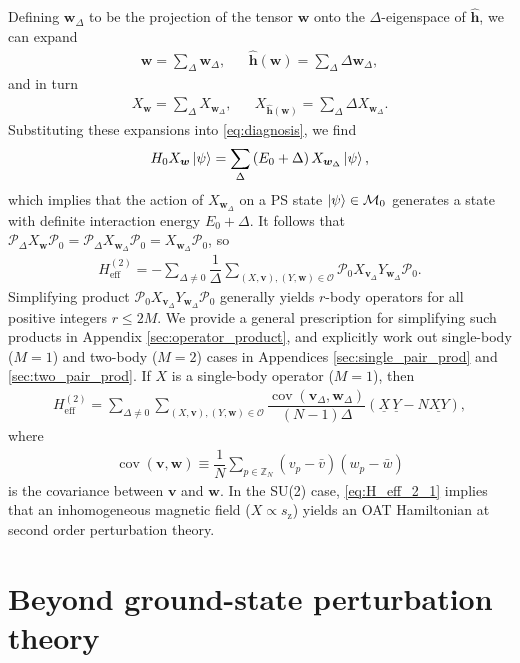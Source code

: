 \documentclass[nofootinbib,notitlepage,11pt]{revtex4-2}
\renewcommand{\t}{\text} %
\newcommand{\f}[2]{\dfrac{#1}{#2}} %
\newcommand{\p}[1]{\left(#1\right)} %
\newcommand{\m}{\bm} %
\newcommand{\1}{\mathds{1}}
\newcommand{\z}{\text{z}}
\newcommand{\M}{\mathcal{M}}
\renewcommand{\O}{\mathcal{O}}
\renewcommand{\P}{\mathcal{P}}
\newcommand{\ZZ}{\mathbb{Z}}
\newcommand{\col}{\underline}
\DeclareMathOperator{\cov}{cov}
\begin{document}
Defining $\m w_\Delta$ to be the projection of the tensor $\m w$ onto
the $\Delta$-eigenspace of $\hat{\m h}$, we can expand
\begin{align}
  \m w = \sum_\Delta \m w_\Delta,
  &&
  \hat{\m h}\p{\m w} = \sum_\Delta \Delta \m w_\Delta,
\end{align}
and in turn
\begin{align}
  X_{\m w} = \sum_\Delta X_{\m w_\Delta},
  &&
  X_{\hat{\m h}\p{\m w}} = \sum_\Delta \Delta X_{\m w_\Delta}.
\end{align}
Substituting these expansions into \eqref{eq:diagnosis}, we find
\begin{align}
  H_0 X_{\m w} \ket\psi
  = \sum_\Delta\p{E_0 + \Delta} X_{\m w_\Delta} \ket\psi,
\end{align}
which implies that the action of $X_{\m w_\Delta}$ on a PS state
$\ket\psi\in\M_0$ generates a state with definite interaction energy
$E_0+\Delta$.  It follows that
$\P_\Delta X_{\m w} \P_0 = \P_\Delta X_{\m w_\Delta} \P_0 =
X_{\m{w}_\Delta} \P_0$, so
\begin{align}
  H_{\t{eff}}^{(2)} = -\sum_{\Delta\ne0} \f1\Delta
  \sum_{\p{X,\m v},\p{Y,\m w}\in\O}
  \P_0 X_{\m v_\Delta} Y_{\m w_\Delta} \P_0.
\end{align}
Simplifying product $\P_0 X_{\m v_\Delta} Y_{\m w_\Delta} \P_0$
generally yields $r$-body operators for all positive integers
$r\le2M$.  We provide a general prescription for simplifying such
products in Appendix \ref{sec:operator_product}, and explicitly work
out single-body ($M=1$) and two-body ($M=2$) cases in Appendices
\ref{sec:single_pair_prod} and \ref{sec:two_pair_prod}.  If $X$ is a
single-body operator ($M=1$), then
\begin{align}
  H_{\t{eff}}^{(2)}
  = \sum_{\Delta\ne0} \sum_{\p{X,\m v},\p{Y,\m w}\in\O}
  \f{\cov\p{\m v_\Delta,\m w_\Delta}}{\p{N-1}\Delta}
  \p{\col{X}\,\col{Y} - N \col{XY}},
  \label{eq:H_eff_2_1}
\end{align}
where
\begin{align}
  \cov\p{\m v,\m w} \equiv
  \f1N \sum_{p\in\ZZ_N} \p{v_p-\bar v}\p{w_p-\bar w}
\end{align}
is the covariance between $\m v$ and $\m w$.  In the SU(2) case,
\eqref{eq:H_eff_2_1} implies that an inhomogeneous magnetic field
($X\propto s_\z$) yields an OAT Hamiltonian at second order
perturbation theory.

\section{Beyond ground-state perturbation theory}
\end{document}
